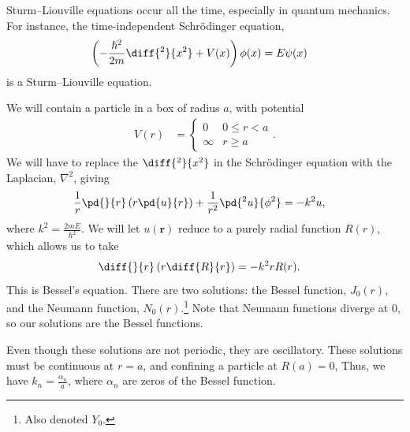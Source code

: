 \documentclass[10pt]{mypackage}
\renewcommand*{\hbar}{\hslash}
\begin{document}
  Sturm--Liouville equations occur all the time, especially in quantum mechanics. For instance, the time-independent Schrödinger equation,
  \begin{align*}
    \left( -\frac{\hbar^2}{2m}\diff{^2}{x^2} + V(x) \right)\phi(x) &= E\psi(x)
  \end{align*}
    is a Sturm--Liouville equation.
    \begin{example}
      We will contain a particle in a box of radius $a$, with potential
      \begin{align*}
        V(r) &= \begin{cases}
          0 & 0 \leq r < a\\
          \infty & r\geq a
        \end{cases}.
      \end{align*}
      We will have to replace the $\diff{^2}{x^2}$ in the Schrödinger equation with the Laplacian, $\nabla^2$, giving
      \begin{align*}
        \frac{1}{r} \pd{}{r}\left( r\pd{u}{r} \right) + \frac{1}{r^2}\pd{^2u}{\phi^2} &= -k^2 u,
      \end{align*}
      where $k^2 = \frac{2mE}{\hbar^2}$. We will let $u\left( \mathbf{r} \right)$ reduce to a purely radial function $R(r)$, which allows us to take
      \begin{align*}
        \diff{}{r}\left( r\diff{R}{r} \right) &= -k^2rR(r).
      \end{align*}
      This is Bessel's equation. There are two solutions: the Bessel function, $J_0(r)$, and the Neumann function, $N_0(r)$.\footnote{Also denoted $Y_0$.} Note that Neumann functions diverge at $0$, so our solutions are the Bessel functions.\newline

      Even though these solutions are not periodic, they are oscillatory. These solutions must be continuous at $r = a$, and confining a particle at $R(a) = 0$, Thus, we have $k_n = \frac{\alpha_n}{a}$, where $\alpha_n$ are zeros of the Bessel function.\newline


\end{example}
\end{document}
